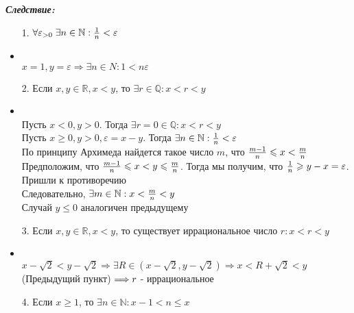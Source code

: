 \documentclass[12pt,letterpaper]{report}
\makeatletter
\renewenvironment{proof}[1][\proofname]{%
   \par\pushQED{\qed}\normalfont%
   \topsep6\p@\@plus6\p@\relax
   \trivlist\item[\hskip\labelsep\bfseries#1\@addpunct{.}]%
   \ignorespaces
}{%
   \popQED\endtrivlist\@endpefalse
}
\makeatother
\begin{document}
\textbf{\textit{Следствие:}}
    \begin{itemize}
        \item[1.] $\forall \varepsilon_{> 0} \; \exists n \in \mathbb{N}: {{1}\over{n}} < \varepsilon$
        \begin{proof}
           \quad \\ $x = 1, y = \varepsilon \Longrightarrow \exists n \in N: 1 < n\varepsilon$
        \end{proof} 
        \item[2.] Если $x, y \in \mathbb{R}, x < y$, то $\exists r \in \mathbb{Q}: x < r < y$ 
        \begin{proof}
            \quad \\ Пусть $x < 0, y > 0$. Тогда $\exists r = 0 \in \mathbb{Q}: x < r < y$ \\
            Пусть $x \geqslant 0, y > 0, \varepsilon = x - y$. Тогда $\exists n \in \mathbb{N}: {{1}\over{n}} < \varepsilon$ \\
            По принципу Архимеда найдется такое число $m$, что ${{m-1}\over{n}} \leqslant x < {{m}\over{n}}$ \vspace{0.2cm} \\
            Предположим, что ${{m-1}\over{n}} \leqslant x < y \leqslant {{m}\over{n}}$. Тогда мы получим, что ${{1}\over{n}} \geqslant y - x = \varepsilon$.
            Пришли к противоречию\\
            Следовательно, $\exists m \in \mathbb{N} : x < {{m}\over{n}} < y$ \\
            Случай $y \leqslant 0$ аналогичен предыдущему
        \end{proof} 
        \item[3.] Если $x, y \in \mathbb{R}, x < y$, то существует иррациональное число $r: x < r < y$ 
        \begin{proof}
            \quad \\ $x - \sqrt{2} < y - \sqrt{2} \Longrightarrow \exists R \in (x - \sqrt{2}, y - \sqrt{2}) \Longrightarrow
            x < R + \sqrt{2} < y \; $(Предыдущий пункт)$ \; \Longrightarrow \\ r$ - иррациональное
        \end{proof} 
        \item[4.] Если $x \geqslant 1$, то $\exists n \in \mathbb{N}: x - 1 < n \leqslant x$ 
    \end{itemize}
\ifdefined\niveldos\else
\end{document}
